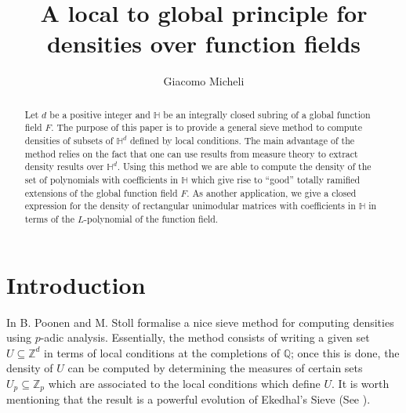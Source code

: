 \documentclass[10pt]{amsart}
\newcommand{\vZ}{\mathbb{Z}}
\newcommand{\vQ}{\mathbb{Q}}
\newcommand{\vH}{\mathbb{H}}
\theoremstyle{definition}
\theoremstyle{remark}
\numberwithin{equation}{section}
\begin{document}
\title[A Local to global principle for densities]
{A local to global principle for densities over function fields}

\author[Giacomo Micheli]{Giacomo Micheli}
\address{Mathematical Institute\\
University of Oxford\\
Andrew Wiles Building\\ 
Woodstock~Road \\Oxford, UK
}

\subjclass[2010]{}


\begin{abstract}
Let $d$ be a positive integer and $\vH$ be an integrally closed subring of a global function field $F$.
The purpose of this paper is to provide a general sieve method to compute densities of subsets of $\vH^d$ defined by  local conditions. The main advantage of the method relies on the fact that one can use results from  measure theory to extract density results over $\vH^{d}$.
Using this method we are able to compute the density of the set of polynomials with coefficients in $\vH$ which give rise to ``good'' totally ramified extensions of the global function field $F$. As another application, we give a closed expression for the density of rectangular unimodular matrices with coefficients in $\vH$ in terms of the $L$-polynomial of the function field.
\end{abstract}

\maketitle

\section{Introduction}
\label{sec:introduction}
In \cite[Lemma 20]{bib:poonenAnn} B. Poonen and M. Stoll formalise a nice sieve method for computing densities using $p$-adic analysis. Essentially, the method consists of writing a given set $U\subseteq \vZ^d$ in terms of local conditions at the completions of $\vQ$;
once this is done, the density of $U$ can be computed by determining the measures of certain sets $U_p\subseteq \vZ_p$ which are associated to the local conditions which define $U$.
It is worth mentioning that the result is a powerful evolution of Ekedhal's Sieve (See \cite{torsten1991infinite}).
\end{document}
